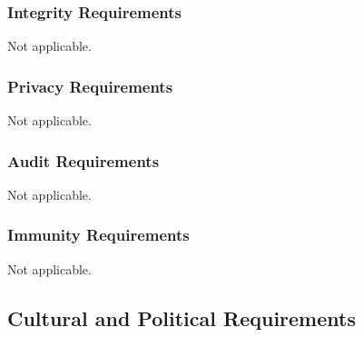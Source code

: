 \documentclass[12pt, titlepage]{article}
\begin{document}
\subsubsection{Integrity Requirements}
Not applicable.
\subsubsection{Privacy Requirements}
Not applicable.
\subsubsection{Audit Requirements}
Not applicable.
\subsubsection{Immunity Requirements}
Not applicable.

\newpage
\subsection{Cultural and Political Requirements}
\end{document}
